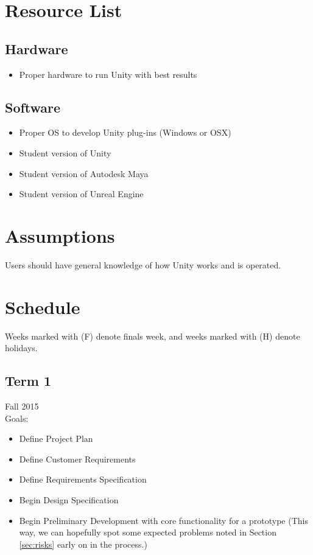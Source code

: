 \documentclass[12pt]{article}
\begin{document}
\section{Resource List}
\label{sec:resource}
\subsection{Hardware}
\begin{itemize}
  \item Proper hardware to run Unity with best results
\end{itemize}

\subsection{Software}
\begin{itemize}
  \item Proper OS to develop Unity plug-ins (Windows or OSX)
  \item Student version of Unity
  \item Student version of Autodesk Maya
  \item Student version of Unreal Engine
\end{itemize}

\section{Assumptions}
\label{sec:assumptions}
Users should have general knowledge of how Unity works and is operated.

\section{Schedule}
\label{sec:schedule}
Weeks marked with (F) denote finals week, and weeks marked with (H) denote holidays.

\subsection{Term 1}
Fall 2015 \\
Goals:
\begin{itemize}
	\item Define Project Plan
	\item Define Customer Requirements
	\item Define Requirements Specification
	\item Begin Design Specification
	\item Begin Preliminary Development with core functionality for a prototype (This way, we can hopefully spot some expected problems noted in Section \ref{sec:risks} early on in the process.)
\end{itemize}
\end{document}

